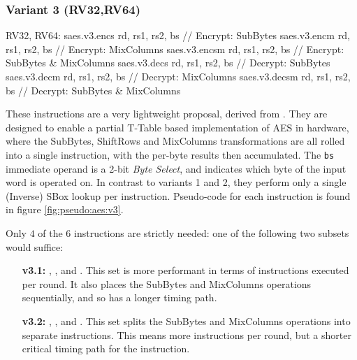 
\subsubsection{Variant 3 (RV32,RV64)}

\begin{cryptoisa}
RV32, RV64:
    saes.v3.encs      rd, rs1, rs2, bs // Encrypt: SubBytes
    saes.v3.encm      rd, rs1, rs2, bs // Encrypt: MixColumns
    saes.v3.encsm     rd, rs1, rs2, bs // Encrypt: SubBytes & MixColumns
    saes.v3.decs      rd, rs1, rs2, bs // Decrypt: SubBytes
    saes.v3.decm      rd, rs1, rs2, bs // Decrypt: MixColumns
    saes.v3.decsm     rd, rs1, rs2, bs // Decrypt: SubBytes & MixColumns
\end{cryptoisa}

These instructions are a very lightweight proposal, derived from
\cite{MJS:20}.
They are designed to enable a partial T-Table based implementation
of AES in hardware, where the SubBytes, ShiftRows and MixColumns
transformations are all rolled into a single instruction, with the
per-byte results then accumulated.
The {\tt bs} immediate operand is a 2-bit {\em Byte Select}, and indicates
which byte of the input word is operated on.
In contrast to variants 1 and 2, they perform only a single (Inverse) SBox
lookup per instruction.
Pseudo-code for each instruction is found in figure
\ref{fig:pseudo:aes:v3}.

Only $4$ of the $6$ instructions are strictly needed: one of the following two
subsets would suffice:
\begin{enumerate}
\item[{\bf v3.1:}]  ,
                    ,
                     and
                    .
    This set is more performant in terms of instructions executed per
    round.
    It also places the SubBytes and MixColumns operations
    sequentially, and so has a longer timing path.
\item[{\bf v3.2:}]  ,
                    ,
                     and
                    .
    This set splits the SubBytes and MixColumns operations into separate
    instructions.
    This means more instructions per round, but a shorter critical
    timing path for the instruction.
\end{enumerate}

